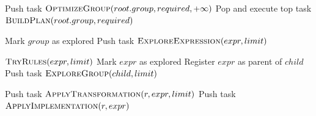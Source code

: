 \documentclass[14pt, russian]{scrartcl}
\begin{document}
\begin{algorithm}[H]
    \caption{Алгоритм поиска (часть 1).}%
    \label{alg:cascades-search}
    \footnotesize
    \begin{algorithmic}[1]
        \State Push task $\Call{OptimizeGroup}{root.group, required, +\infty}$
            \State Pop and execute top task
        \EndWhile
        \State \Return $\Call{BuildPlan}{root.group, required}$
    \EndProcedure

        \State Mark $group$ as explored
            \State Push task $\Call{ExploreExpression}{expr, limit}$
        \EndFor
    \EndProcedure

        \State $\Call{TryRules}{expr, limit}$
            \State \Return
        \EndIf
        \State Mark $expr$ as explored
            \State Register $expr$ as parent of $child$
                \State Push task $\Call{ExploreGroup}{child, limit}$
            \EndIf
        \EndFor
    \EndProcedure

            \State Push task $\Call{ApplyTransformation}{r, expr, limit}$
        \EndFor
            \State Push task $\Call{ApplyImplementation}{r, expr}$
        \EndFor
    \EndProcedure
    \end{algorithmic}
\end{algorithm}
\end{document}
